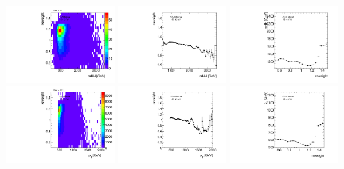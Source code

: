 \begin{figure}[htbp!]
\begin{center}
\includegraphics[angle=270, width=0.32\textwidth]{./figures/boosted/AppendixReweight/Weights/2Trk_split_Sideband_mHH_l_weight.pdf}
\includegraphics[angle=270, width=0.32\textwidth]{./figures/boosted/AppendixReweight/Weights/2Trk_split_Sideband_mHH_l_weight_profx.pdf}
\includegraphics[angle=270, width=0.32\textwidth]{./figures/boosted/AppendixReweight/Weights/2Trk_split_Sideband_mHH_l_weight_profy.pdf}\\
\includegraphics[angle=270, width=0.32\textwidth]{./figures/boosted/AppendixReweight/Weights/2Trk_split_Sideband_leadHCand_Pt_m_weight.pdf}
\includegraphics[angle=270, width=0.32\textwidth]{./figures/boosted/AppendixReweight/Weights/2Trk_split_Sideband_leadHCand_Pt_m_weight_profx.pdf}
\includegraphics[angle=270, width=0.32\textwidth]{./figures/boosted/AppendixReweight/Weights/2Trk_split_Sideband_leadHCand_Pt_m_weight_profy.pdf}\\

\end{center}
\end{figure}

